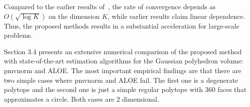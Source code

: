 Compared to the earlier results of~\cite{owen2019importance}, the rate of convergence depends as $O(\sqrt{\log K})$ on the dimension $K$, while earlier results \cite{owen2019importance} claim linear dependence. Thus, the proposed methods results in a substantial acceleration for large-scale problems.

Section 3.4 presents an extensive numerical comparison of the proposed method with state-of-the-art estimation algorithms for the Gaussian polyhedron volume: pmvnorm and ALOE. The most important empirical findings are that there are two simple cases where pmvnorm and ALOE fail. The first one is a degenerate polytope and the second one is just a simple regular polytope with 360 faces that approximates a circle. Both cases are 2 dimensional.





